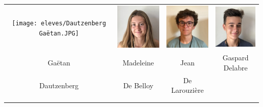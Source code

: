 \begin{center}
\begin{tabular}{cccc}
\texttt{[image: eleves/Dautzenberg Gaëtan.JPG]} &
\includegraphics[angle=270,origin=c, width=27mm]{eleves/De Belloy Madeleine.JPG} &
\includegraphics[angle=270,origin=c, width=27mm]{eleves/De Larouziere Jean.JPG} &
\includegraphics[angle=270,origin=c, width=27mm]{eleves/Delabre Gaspard.JPG} \\
Gaëtan & Madeleine & Jean & Gaspard Delabre \\ Dautzenberg & De Belloy & De Larouzière & \\ \\ \\ 

\end{tabular}
\end{center}

\vfill
\pagebreak

